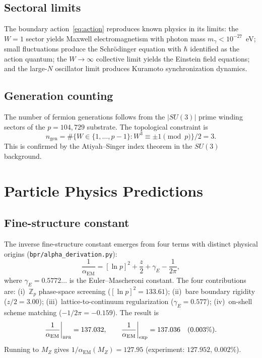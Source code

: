 \documentclass[aps,prd,twocolumn,superscriptaddress,longbibliography,nofootinbib]{revtex4-2}
\newcommand{\Zp}{\mathbb{Z}_p}
\newcommand{\alphaEM}{\alpha_{\mathrm{EM}}}
\newcommand{\MZ}{M_Z}
\newcommand{\bpr}{\textsc{bpr}}
\begin{document}
\subsection{Sectoral limits}

The boundary action~\eqref{eq:action} reproduces known physics in its limits:
the $W = 1$ sector yields Maxwell electromagnetism with photon mass
$m_\gamma < 10^{-27}$~eV; small fluctuations produce the Schr\"odinger
equation with $\hbar$ identified as the action quantum; the $W \to \infty$
collective limit yields the Einstein field equations; and the large-$N$
oscillator limit produces Kuramoto synchronization dynamics.

\subsection{Generation counting}

The number of fermion generations follows from the $|SU(3)|$ prime winding
sectors of the $p = 104{,}729$ substrate.  The topological constraint is
\begin{equation}
n_{\mathrm{gen}} = \#\bigl\{W \in \{1,\ldots,p-1\} :
  W^3 \equiv \pm 1 \pmod{p}\bigr\} / 2 = 3.
\label{eq:ngen}
\end{equation}
This is confirmed by the Atiyah--Singer index theorem in the $SU(3)$ background.


\section{Particle Physics Predictions}
\label{sec:particle}

\subsection{Fine-structure constant}

The inverse fine-structure constant emerges from four terms with distinct
physical origins (\texttt{bpr/alpha\_derivation.py}):
\begin{equation}
\frac{1}{\alphaEM} = [\ln p]^2 + \frac{z}{2} + \gamma_E - \frac{1}{2\pi},
\label{eq:alpha}
\end{equation}
where $\gamma_E = 0.5772\ldots$ is the Euler--Mascheroni constant.
The four contributions are: (i)~$\Zp$ phase-space screening
($[\ln p]^2 = 133.61$); (ii)~bare boundary rigidity ($z/2 = 3.00$);
(iii)~lattice-to-continuum regularization ($\gamma_E = 0.577$);
(iv)~on-shell scheme matching ($-1/2\pi = -0.159$).  The result is
\begin{equation}
\frac{1}{\alphaEM}\bigg|_{\bpr} = 137.032, \qquad
\frac{1}{\alphaEM}\bigg|_{\mathrm{exp}} = 137.036 \quad (0.003\%).
\end{equation}
Running to $\MZ$ gives $1/\alphaEM(\MZ) = 127.95$ (experiment: $127.952$,
$0.002\%$).
\end{document}
